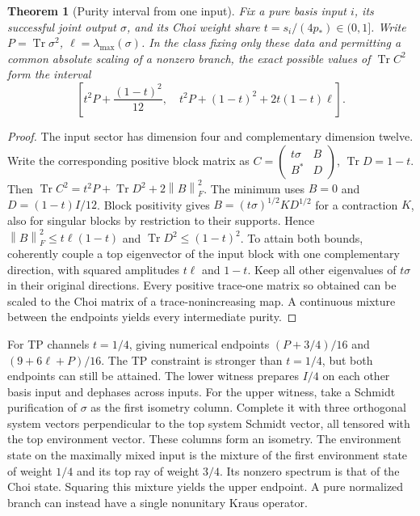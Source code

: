 \documentclass[11pt,letterpaper]{article}
\newtheorem{theorem}{Theorem}[section]\newtheorem{proposition}[theorem]{Proposition}\newtheorem{corollary}[theorem]{Corollary}
\newcommand{\tr}{\operatorname{Tr}}\newcommand{\TV}{\operatorname{TV}}\newcommand{\E}{\mathbb E}\newcommand{\id}{\mathbb I}\newcommand{\calB}{\mathcal B}\newcommand{\norm}[1]{\left\lVert#1\right\rVert}
\begin{document}
\begin{theorem}[Purity interval from one input]\label{thm:purity}
Fix a pure basis input $i$, its successful joint output $\sigma$, and its Choi weight share $t=s_i/(4p_*)\in(0,1]$. Write $P=\tr\sigma^2$, $\ell=\lambda_{\max}(\sigma)$. In the class fixing only these data and permitting a common absolute scaling of a nonzero branch, the exact possible values of $\tr C^2$ form the interval
\[
 \left[t^2P+\frac{(1-t)^2}{12},\quad
 t^2P+(1-t)^2+2t(1-t)\ell\right].
\]
\end{theorem}
\begin{proof}
The input sector has dimension four and complementary dimension twelve. Write the corresponding positive block matrix as $C=\left(\begin{smallmatrix}t\sigma&B\\B^*&D\end{smallmatrix}\right)$, $\tr D=1-t$. Then $\tr C^2=t^2P+\tr D^2+2\norm B_F^2$. The minimum uses $B=0$ and $D=(1-t)I/12$. Block positivity gives $B=(t\sigma)^{1/2}KD^{1/2}$ for a contraction $K$, also for singular blocks by restriction to their supports. Hence $\norm B_F^2\le t\ell(1-t)$ and $\tr D^2\le(1-t)^2$. To attain both bounds, coherently couple a top eigenvector of the input block with one complementary direction, with squared amplitudes $t\ell$ and $1-t$. Keep all other eigenvalues of $t\sigma$ in their original directions. Every positive trace-one matrix so obtained can be scaled to the Choi matrix of a trace-nonincreasing map. A continuous mixture between the endpoints yields every intermediate purity.
\end{proof}

For TP channels $t=1/4$, giving numerical endpoints $(P+3/4)/16$ and $(9+6\ell+P)/16$. The TP constraint is stronger than $t=1/4$, but both endpoints can still be attained. The lower witness prepares $I/4$ on each other basis input and dephases across inputs. For the upper witness, take a Schmidt purification of $\sigma$ as the first isometry column. Complete it with three orthogonal system vectors perpendicular to the top system Schmidt vector, all tensored with the top environment vector. These columns form an isometry. The environment state on the maximally mixed input is the mixture of the first environment state of weight $1/4$ and its top ray of weight $3/4$. Its nonzero spectrum is that of the Choi state. Squaring this mixture yields the upper endpoint. A pure normalized branch can instead have a single nonunitary Kraus operator.
\end{document}
